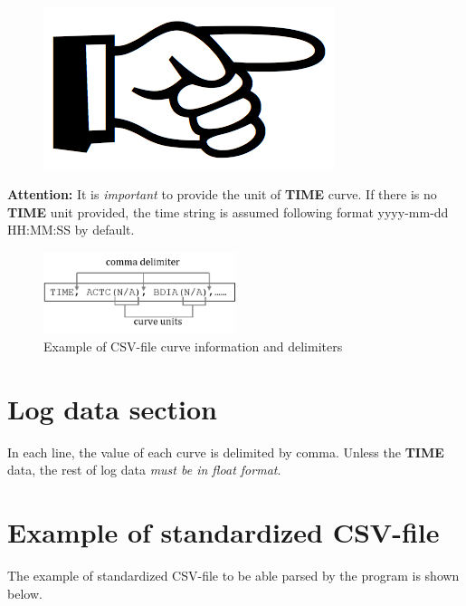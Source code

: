 \documentclass[12pt,a4paper,oneside]{report}
\begin{document}
\begin{appendices}
\paragraph{}
\begin{figure}
\vspace{-15pt}
\includegraphics[scale=0.08]{fig/hand_point.png}
\end{figure}
\noindent\textbf{Attention:} It is \emph{important} to provide the unit of \textbf{TIME} curve. If there is no \textbf{TIME} unit provided, the time string is assumed following format {\color{violet}yyyy-mm-dd HH:MM:SS} by default.

\begin{figure}[ht]
\centering
\includegraphics[width=0.5\textwidth]{fig/csv_curve_info_1.png}
\caption{Example of CSV-file curve information and delimiters}
\end{figure}

\section{Log data section}
In each line, the value of each curve is delimited by comma. Unless the \textbf{TIME} data, the rest of log data \emph{must be in float format}.
\pagebreak
\section{Example of standardized CSV-file}
The example of standardized CSV-file to be able parsed by the program is shown below.
\begin{mdframed}[backgroundcolor=gray!10]
\raggedright
\texttt{}
\end{mdframed}


\end{appendices}
\end{document}
